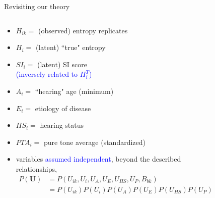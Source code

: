 %
%
\begin{frame}
	{Revisiting our theory}
	\begin{columns}
		\begin{column}{0.5\textwidth}
			\begin{itemize}
				\item $H_{ik}=$ (observed) entropy replicates
				\item $H_{i}=$ (latent) ``true" entropy
				\item $SI_{i}=$ (latent) SI score \\
				{\small \textcolor{blue}{(inversely related to $H^{T}_{i}$)} }
				\item $A_{i}=$ ``hearing" age (minimum)
				\item $E_{i}=$ etiology of disease
				\item $HS_{i}=$ hearing status
				\item $PTA_{i}=$ pure tone average (standardized)
				\item variables \textcolor{blue}{assumed independent}, beyond the described relationships,
				\begin{equation*}
					\begin{aligned} 
						P(\pmb{U}) & = P(U_{ik}, U_{i}, U_{A}, U_{E}, U_{HS}, U_{P}, B_{bk}) \\ 
						& = P(U_{ik}) P(U_{i}) P(U_{A}) P(U_{E}) P(U_{HS}) P(U_{P}) P(B_{bk})
					\end{aligned}
				\end{equation*}
			\end{itemize}
		\end{column}
		\begin{column}{0.5\textwidth}  
			\begin{figure}
\end{figure}
\end{column}
\end{columns}
\end{frame}
